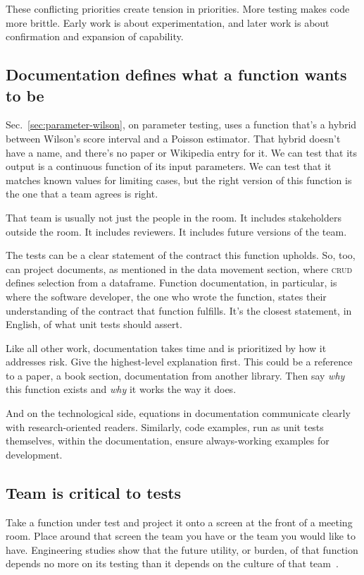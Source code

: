 \documentclass[fleqn,10pt]{olplainarticle}
\begin{document}
These conflicting priorities create tension in priorities.
More testing makes code more brittle. Early work is about
experimentation, and later work is about confirmation and
expansion of capability.


\subsection{Documentation defines what a function wants to be}

Sec.~\ref{sec:parameter-wilson}, on parameter testing, uses a function that's a hybrid
between Wilson's score interval and a Poisson estimator. That hybrid
doesn't have a name, and there's no paper or Wikipedia entry for it.
We can test that its output is a continuous function of its input
parameters. We can test that it matches known values for limiting cases,
but the right version of this function is the one that a team agrees
is right.

That team is usually not just the people in the room. It includes stakeholders
outside the room. It includes reviewers. It includes future versions of the team.

The tests can be a clear statement of the contract this function upholds.
So, too, can project documents, as mentioned in the data movement section,
where \textsc{crud} defines selection from a dataframe. 
Function documentation, in particular, is where the software
developer, the one who wrote the function, states their understanding
of the contract that function fulfills. It's the closest statement,
in English, of what unit tests should assert.

Like all other work, documentation takes time and is prioritized by
how it addresses risk. Give the highest-level explanation first.
This could be a reference to a paper, a book section, documentation from another library.
Then say \emph{why} this function exists and \emph{why} it works the
way it does.

And on the technological side, equations in documentation communicate
clearly with research-oriented readers. Similarly, code examples, run
as unit tests themselves, within the documentation, ensure always-working
examples for development.


\subsection{Team is critical to tests}

Take a function under test and project it onto a
screen at the front of a meeting room. Place around that screen
the team you have or the team you would like to have.
Engineering studies show that the future utility, or burden,
of that function depends no more on its testing than it
depends on the culture of that team~\citep{neumann2016,kanewala2014}.
\end{document}
